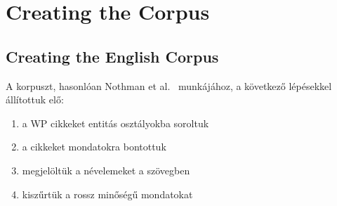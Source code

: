 \documentclass{llncs}
\begin{document}



\section{Creating the Corpus}
\subsection{Creating the English Corpus}

A korpuszt, hasonlóan Nothman et al.~ munkájához, a következő
lépésekkel állítottuk elő:
 
\begin{enumerate}
\item a WP cikkeket entitás osztályokba soroltuk
\item a cikkeket mondatokra bontottuk
\item megjelöltük a névelemeket a szövegben
\item kiszűrtük a rossz minőségű mondatokat
\end{enumerate}
\end{document}
